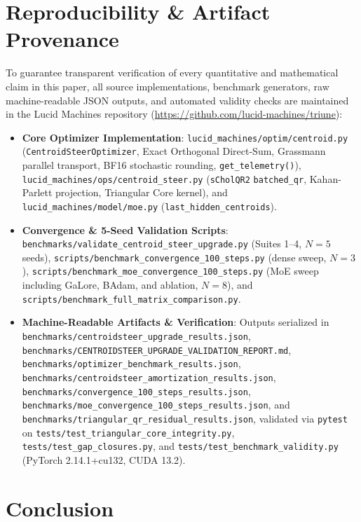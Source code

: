 \documentclass[10pt,twocolumn,letterpaper]{article}
\begin{document}
\section{Reproducibility \& Artifact Provenance}

To guarantee transparent verification of every quantitative and mathematical claim in this paper, all source implementations, benchmark generators, raw machine-readable JSON outputs, and automated validity checks are maintained in the Lucid Machines repository (\url{https://github.com/lucid-machines/triune}):
\begin{itemize}\raggedright\setlength{\itemsep}{2pt}
    \item \textbf{Core Optimizer Implementation}: \nolinkurl{lucid_machines/optim/centroid.py} (\texttt{CentroidSteerOptimizer}, Exact Orthogonal Direct-Sum, Grassmann parallel transport, BF16 stochastic rounding, \texttt{get\_telemetry()}), \nolinkurl{lucid_machines/ops/centroid_steer.py} (\texttt{sCholQR2} \texttt{batched\_qr}, Kahan-Parlett projection, Triangular Core kernel), and \nolinkurl{lucid_machines/model/moe.py} (\texttt{last\_hidden\_centroids}).
    \item \textbf{Convergence \& 5-Seed Validation Scripts}: \nolinkurl{benchmarks/validate_centroid_steer_upgrade.py} (Suites 1--4, $N=5$ seeds), \nolinkurl{scripts/benchmark_convergence_100_steps.py} (dense sweep, $N=3$), \nolinkurl{scripts/benchmark_moe_convergence_100_steps.py} (MoE sweep including GaLore, BAdam, and ablation, $N=8$), and \nolinkurl{scripts/benchmark_full_matrix_comparison.py}.
    \item \textbf{Machine-Readable Artifacts \& Verification}: Outputs serialized in \nolinkurl{benchmarks/centroidsteer_upgrade_results.json}, \nolinkurl{benchmarks/CENTROIDSTEER_UPGRADE_VALIDATION_REPORT.md}, \nolinkurl{benchmarks/optimizer_benchmark_results.json}, \nolinkurl{benchmarks/centroidsteer_amortization_results.json}, \nolinkurl{benchmarks/convergence_100_steps_results.json}, \nolinkurl{benchmarks/moe_convergence_100_steps_results.json}, and \nolinkurl{benchmarks/triangular_qr_residual_results.json}, validated via \texttt{pytest} on \nolinkurl{tests/test_triangular_core_integrity.py}, \nolinkurl{tests/test_gap_closures.py}, and \nolinkurl{tests/test_benchmark_validity.py} (PyTorch 2.14.1+cu132, CUDA 13.2).
\end{itemize}

\section{Conclusion}
\end{document}
